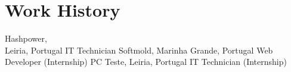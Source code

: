 \section[\faGears]{Work History}
    {Hashpower,\\Leiria, Portugal}
    {IT Technician}
    {}
    {Softmold, Marinha Grande, Portugal}
    {Web Developer (Internship)}
    {}
    {PC Teste, Leiria, Portugal}
    {IT Technician (Internship)}
    {}
    
